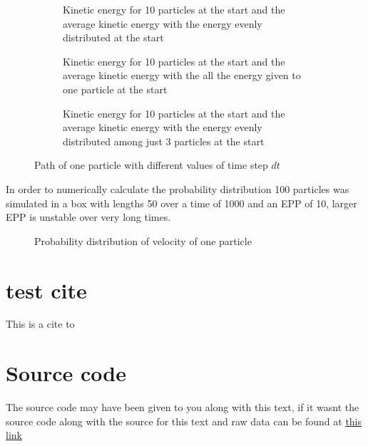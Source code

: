 \documentclass[10pt,a4paper,aps,twocolumn,secnumarabic,numerical,balancelastpage,nofootinbib,superscriptaddress]{revtex4-2}
\begin{document}
	
		\begin{figure*}[htb]
			\centering
			\begin{subfigure}{.45\textwidth}
				\scalebox{0.6}{}
				\caption{Kinetic energy for 10 particles at the start and the average kinetic energy with the energy evenly distributed at the start}
			\end{subfigure}
			\begin{subfigure}{.45\textwidth}
				\scalebox{0.6}{}
				\caption{Kinetic energy for 10 particles at the start and the average kinetic energy with the all the energy given to one particle at the start}
			\end{subfigure}
			\begin{subfigure}{.45\textwidth}
				\scalebox{0.6}{}
				\caption{Kinetic energy for 10 particles at the start and the average kinetic energy with the energy evenly distributed among just 3 particles at the start}
			\end{subfigure}
			\caption{Path of one particle with different values of time step $dt$}
		\end{figure*}
		
		In order to numerically calculate the probability distribution 100 particles was simulated in a box with lengths 50 over a time of 1000 and an EPP of 10, larger EPP is unstable over very long times.
		\begin{figure*}
			\centering
			\scalebox{0.8}{}
			\caption{Probability distribution of velocity of one particle}
		\end{figure*}
	
	\section{test cite}
	
		This is a cite to \citep{Agarwal2001}
	
	
	\appendix
	
		\section{Source code}
		
			The source code may have been given to you along with this text, if it wasnt the source code along with the source for this text and raw data can be found at \href{https://github.com/Mannen-I-Skogen/TFY4230-Numerical}{this link}
	
	
\end{document}
